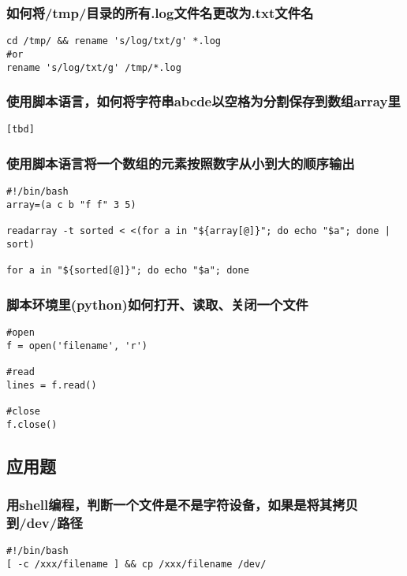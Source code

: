 \documentclass{article}
\begin{document}
\subsubsection{如何将/tmp/目录的所有.log文件名更改为.txt文件名}
\begin{verbatim}
cd /tmp/ && rename 's/log/txt/g' *.log
#or
rename 's/log/txt/g' /tmp/*.log
\end{verbatim}

\subsubsection{使用脚本语言，如何将字符串abcde以空格为分割保存到数组array里}
\begin{verbatim}
[tbd]
\end{verbatim}


\subsubsection{使用脚本语言将一个数组的元素按照数字从小到大的顺序输出}
\begin{verbatim}
#!/bin/bash
array=(a c b "f f" 3 5)

readarray -t sorted < <(for a in "${array[@]}"; do echo "$a"; done | sort)

for a in "${sorted[@]}"; do echo "$a"; done

\end{verbatim}

\subsubsection{脚本环境里(python)如何打开、读取、关闭一个文件}
\begin{verbatim}
#open
f = open('filename', 'r')

#read
lines = f.read()

#close
f.close()

\end{verbatim}

\subsection{应用题}

\subsubsection{用shell编程，判断一个文件是不是字符设备，如果是将其拷贝到/dev/路径}
\begin{verbatim}
#!/bin/bash
[ -c /xxx/filename ] && cp /xxx/filename /dev/
\end{verbatim}
\end{document}
